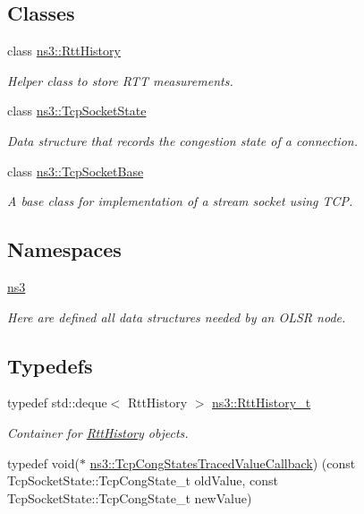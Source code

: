 \subsection*{Classes}
\begin{DoxyCompactItemize}
\item 
class \hyperlink{classns3_1_1RttHistory}{ns3\+::\+Rtt\+History}
\begin{DoxyCompactList}\small\item\em Helper class to store R\+TT measurements. \end{DoxyCompactList}\item 
class \hyperlink{classns3_1_1TcpSocketState}{ns3\+::\+Tcp\+Socket\+State}
\begin{DoxyCompactList}\small\item\em Data structure that records the congestion state of a connection. \end{DoxyCompactList}\item 
class \hyperlink{classns3_1_1TcpSocketBase}{ns3\+::\+Tcp\+Socket\+Base}
\begin{DoxyCompactList}\small\item\em A base class for implementation of a stream socket using T\+CP. \end{DoxyCompactList}\end{DoxyCompactItemize}
\subsection*{Namespaces}
\begin{DoxyCompactItemize}
\item 
 \hyperlink{namespacens3}{ns3}
\begin{DoxyCompactList}\small\item\em Here are defined all data structures needed by an O\+L\+SR node. \end{DoxyCompactList}\end{DoxyCompactItemize}
\subsection*{Typedefs}
\begin{DoxyCompactItemize}
\item 
typedef std\+::deque$<$ Rtt\+History $>$ \hyperlink{namespacens3_a04f92e99d963a2e9abc4df951063fdcc}{ns3\+::\+Rtt\+History\+\_\+t}
\begin{DoxyCompactList}\small\item\em Container for \hyperlink{classns3_1_1RttHistory}{Rtt\+History} objects. \end{DoxyCompactList}\item 
typedef void($\ast$ \hyperlink{group__tcp_ga6132ce5e376bdb6e343039abd59e0c57}{ns3\+::\+Tcp\+Cong\+States\+Traced\+Value\+Callback}) (const Tcp\+Socket\+State\+::\+Tcp\+Cong\+State\+\_\+t old\+Value, const Tcp\+Socket\+State\+::\+Tcp\+Cong\+State\+\_\+t new\+Value)
\end{DoxyCompactItemize}
